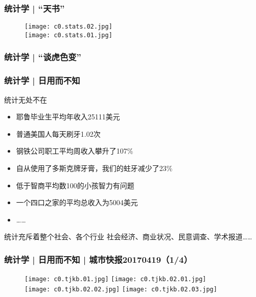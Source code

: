 \begin{frame}
  \frametitle{统计学 | “天书”}
  \begin{figure}
    \centering
    \texttt{[image: c0.stats.02.jpg]}\\
    \texttt{[image: c0.stats.01.jpg]}
  \end{figure}
\end{frame}

\begin{frame}
  \frametitle{统计学 | “谈虎色变”}
  \begin{figure}
    \centering
  \end{figure}
\end{frame}

\begin{frame}[fragile]
  \frametitle{统计学 | 日用而不知}
  \begin{block}{统计无处不在}
    \begin{itemize}
      \item 耶鲁毕业生平均年收入25111美元 
      \item 普通美国人每天刷牙1.02次
      \item 钢铁公司职工平均周收入攀升了107\%
      \item 自从使用了多斯克牌牙膏，我们的蛀牙减少了23\%
      \item 低于智商平均数100的小孩智力有问题
      \item 一个四口之家的平均总收入为5004美元
      \item ……
    \end{itemize}
  \end{block}
  \pause
  \begin{block}{统计充斥着整个社会、各个行业}
    社会经济、商业状况、民意调查、学术报道……
  \end{block}
\end{frame}

\begin{frame}
  \frametitle{统计学 | 日用而不知 | 城市快报20170419（1/4）}
  \begin{figure}
    \centering
    \texttt{[image: c0.tjkb.01.jpg]}\quad
    \texttt{[image: c0.tjkb.02.01.jpg]}\\
    \texttt{[image: c0.tjkb.02.02.jpg]}\quad
    \texttt{[image: c0.tjkb.02.03.jpg]}\\
  \end{figure}
\end{frame}

